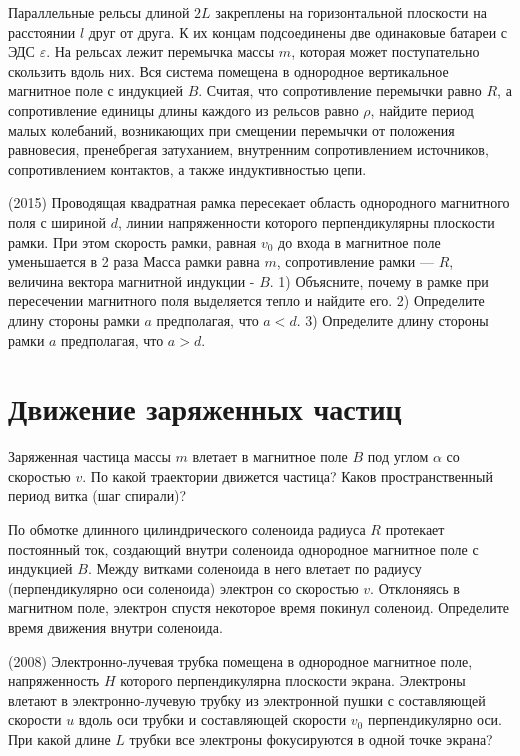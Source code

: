 \AddProb Параллельные рельсы длиной $2L$ закреплены на горизонтальной плоскости на расстоянии $l$ друг от друга. 
К их концам подсоединены две одинаковые батареи с ЭДС {\Large $\varepsilon$}. На рельсах лежит перемычка массы $m$, 
которая может поступательно скользить вдоль них. Вся система помещена в однородное вертикальное магнитное поле с индукцией $B$. 
Считая, что сопротивление перемычки равно $R$, а сопротивление единицы длины каждого из рельсов равно $\rho$, найдите период малых колебаний, 
возникающих при смещении перемычки от положения равновесия, пренебрегая затуханием, внутренним сопротивлением источников, 
сопротивлением контактов, а также индуктивностью цепи.

\AddProb (2015) Проводящая квадратная рамка пересекает область однородного магнитного поля с шириной $d$, линии напряженности которого перпендикулярны плоскости рамки. При этом скорость рамки, равная $v_0$ до входа в магнитное поле уменьшается в 2 раза Масса рамки равна $m$, сопротивление рамки — $R$, величина вектора магнитной индукции - $B$. 1) Объясните, почему в рамке при пересечении магнитного поля выделяется тепло и найдите его. 2) Определите длину стороны рамки $a$ предполагая, что $a<d$. 3) Определите длину стороны рамки $a$ предполагая, что $a>d$.

\section{Движение заряженных частиц}

\AddProb Заряженная частица массы $m$ влетает в магнитное поле $B$ под углом $\alpha$ со скоростью $v$. По какой траектории движется частица? Каков пространственный период витка (шаг спирали)?

\AddProb По обмотке длинного цилиндрического соленоида радиуса $R$ протекает постоянный ток, создающий внутри соленоида однородное магнитное поле с индукцией $B$. Между витками соленоида в него влетает по радиусу (перпендикулярно оси соленоида) электрон со скоростью $v$. Отклоняясь в магнитном поле, электрон спустя некоторое время покинул соленоид. Определите время движения внутри соленоида.

\AddProb (2008) Электронно-лучевая трубка помещена в однородное магнитное поле, напряженность $H$ которого перпендикулярна плоскости экрана. Электроны влетают в электронно-лучевую трубку из электронной пушки с составляющей скорости $u$ вдоль оси трубки и составляющей скорости $v_0$ перпендикулярно оси. При какой длине $L$ трубки все электроны фокусируются в одной точке экрана?

